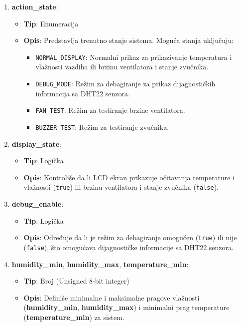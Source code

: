 \documentclass[a4paper, 12pt]{article}
\begin{document}
\begin{enumerate}
    \item \textbf{action\_state}:
        \begin{itemize}
            \item \textbf{Tip}: Enumeracija
            \item \textbf{Opis}: Predstavlja trenutno stanje sistema. Moguća stanja uključuju:
                \begin{itemize}
                    \item \texttt{NORMAL\_DISPLAY}: Normalni prikaz za prikazivanje temperatura i vlažnosti vazdiha ili brzinu ventilatora i stanje zvučnika.
                    \item \texttt{DEBUG\_MODE}: Režim za debagiranje za prikaz dijagnostičkih informacija sa DHT22 senzora.
                    \item \texttt{FAN\_TEST}: Režim za testiranje brzine ventilatora.
                    \item \texttt{BUZZER\_TEST}: Režim za testiranje zvučnika.
                \end{itemize}
        \end{itemize}
        
    \item \textbf{display\_state}:
        \begin{itemize}
            \item \textbf{Tip}: Logička
            \item \textbf{Opis}: Kontroliše da li LCD ekran prikazuje očitavanja temperature i vlažnosti (\texttt{true}) ili brzinu ventilatora i stanje zvučnika (\texttt{false}).
        \end{itemize}
        
    \item \textbf{debug\_enable}:
        \begin{itemize}
            \item \textbf{Tip}: Logička
            \item \textbf{Opis}: Određuje da li je režim za debagiranje omogućen (\texttt{true}) ili nije (\texttt{false}), što omogućava dijagnostičke informacije sa DHT22 senzora.
        \end{itemize}
        
    \item \textbf{humidity\_min}, \textbf{humidity\_max}, \textbf{temperature\_min}:
        \begin{itemize}
            \item \textbf{Tip}: Broj (Unsigned 8-bit integer)
            \sloppypar
            \item \textbf{Opis}: Definiše minimalne i maksimalne pragove vlažnosti (\textbf{humidity\_min}, \textbf{humidity\_max}) i minimalni prag temperature (\textbf{temperature\_min}) za sistem.
        \end{itemize}
        

\end{enumerate}
\end{document}
